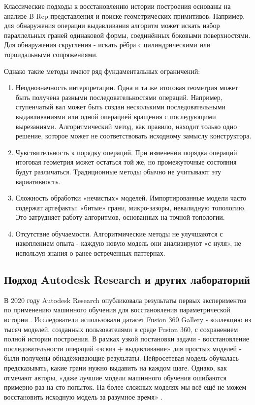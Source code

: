 Классические подходы к восстановлению истории построения основаны на анализе B-Rep представления и поиске геометрических примитивов. Например, для обнаружения операции выдавливания алгоритм может искать набор параллельных граней одинаковой формы, соединённых боковыми поверхностями. Для обнаружения скругления - искать рёбра с цилиндрическими или тороидальными сопряжениями.

Однако такие методы имеют ряд фундаментальных ограничений:

\begin{enumerate}
    \item Неоднозначность интерпретации. Одна и та же итоговая геометрия может быть получена разными последовательностями операций. Например, ступенчатый вал может быть создан несколькими последовательными выдавливаниями или одной операцией вращения с последующими вырезаниями. Алгоритмический метод, как правило, находит только одно решение, которое может не соответствовать исходному замыслу конструктора.
    \item Чувствительность к порядку операций. При изменении порядка операций итоговая геометрия может остаться той же, но промежуточные состояния будут различаться. Традиционные методы обычно не учитывают эту вариативность.
    \item Сложность обработки «нечистых» моделей. Импортированные модели часто содержат артефакты: «битые» грани, микро-зазоры, невалидную топологию. Это затрудняет работу алгоритмов, основанных на точной топологии.
    \item Отсутствие обучаемости. Алгоритмические методы не улучшаются с накоплением опыта - каждую новую модель они анализируют «с нуля», не используя знания о ранее встреченных паттернах.
\end{enumerate}

\subsection{Подход Autodesk Research и других лабораторий}

В 2020 году Autodesk Research опубликовала результаты первых экспериментов по применению машинного обучения для восстановления параметрической истории \cite{autodesk2020}. Исследователи использовали датасет Fusion 360 Gallery - коллекцию из тысяч моделей, созданных пользователями в среде Fusion 360, с сохранением полной истории построения. В рамках узкой постановки задачи - восстановление последовательности операций «эскиз + выдавливание» для простых моделей - были получены обнадёживающие результаты. Нейросетевая модель обучалась предсказывать, какие грани нужно выдавить на каждом шаге. Однако, как отмечают авторы, «даже лучшие модели машинного обучения ошибаются примерно раз на сто попыток. На более сложных моделях мы всё ещё не можем восстановить исходную модель за разумное время» \cite{autodesk2020}.

